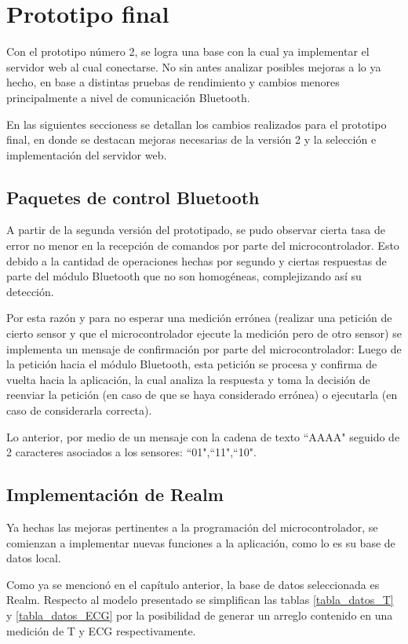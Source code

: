 \chapter{Prototipo final}\label{protof}

Con el prototipo número 2, se logra una base con la cual ya implementar el servidor web al cual conectarse. No sin antes analizar posibles mejoras a lo ya hecho, en base a distintas pruebas de rendimiento y cambios menores principalmente a nivel de comunicación Bluetooth.

En las siguientes seccioness se detallan los cambios realizados para el prototipo final, en donde se destacan mejoras necesarias de la versión 2 y la selección e implementación del servidor web.

\section{Paquetes de control Bluetooth}

A partir de la segunda versión del prototipado, se pudo observar cierta tasa de error no menor en la recepción de comandos por parte del microcontrolador. Esto debido a la cantidad de operaciones hechas por segundo y ciertas respuestas de parte del módulo Bluetooth que no son homogéneas, complejizando así su detección.

Por esta razón y para no esperar una medición errónea (realizar una petición de cierto sensor y que el microcontrolador ejecute la medición pero de otro sensor) se implementa un mensaje de confirmación por parte del microcontrolador: Luego de la petición hacia el módulo Bluetooth, esta petición se procesa y confirma de vuelta hacia la aplicación, la cual analiza la respuesta y toma la decisión de reenviar la petición (en caso de que se haya considerado errónea) o ejecutarla (en caso de considerarla correcta).

Lo anterior, por medio de un mensaje con la cadena de texto ``AAAA" seguido de 2 caracteres asociados a los sensores: ``01",``11",``10".

\section{Implementación de Realm}

Ya hechas las mejoras pertinentes a la programación del microcontrolador, se comienzan a implementar nuevas funciones a la aplicación, como lo es su base de datos local.

Como ya se mencionó en el capítulo anterior, la base de datos seleccionada es Realm. Respecto al modelo presentado se simplifican las tablas \ref{tabla_datos_T} y \ref{tabla_datos_ECG} por la posibilidad de generar un arreglo contenido en una medición de T y ECG respectivamente. 

